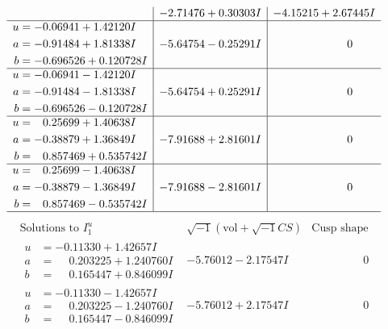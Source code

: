 \documentclass[1p]{elsarticle_modified}
\theoremstyle{definition}
\newcommand{\I}{\sqrt{-1}}
\begin{document}
$$\begin{array}{c|c|c}
 & -2.71476 + 0.30303 I & -4.15215 + 2.67445 I \\ \hline\begin{aligned}
u &= -0.06941 + 1.42120 I \\
a &= -0.91484 + 1.81338 I \\
b &= -0.696526 + 0.120728 I\end{aligned}
 & -5.64754 - 0.25291 I & \phantom{-0.000000 } 0 \\ \hline\begin{aligned}
u &= -0.06941 - 1.42120 I \\
a &= -0.91484 - 1.81338 I \\
b &= -0.696526 - 0.120728 I\end{aligned}
 & -5.64754 + 0.25291 I & \phantom{-0.000000 } 0 \\ \hline\begin{aligned}
u &= \phantom{-}0.25699 + 1.40638 I \\
a &= -0.38879 + 1.36849 I \\
b &= \phantom{-}0.857469 + 0.535742 I\end{aligned}
 & -7.91688 + 2.81601 I & \phantom{-0.000000 } 0 \\ \hline\begin{aligned}
u &= \phantom{-}0.25699 - 1.40638 I \\
a &= -0.38879 - 1.36849 I \\
b &= \phantom{-}0.857469 - 0.535742 I\end{aligned}
 & -7.91688 - 2.81601 I & \phantom{-0.000000 } 0\\
 \hline 
 \end{array}$$\newpage$$\begin{array}{c|c|c}  
\text{Solutions to }I^u_{1}& \I (\text{vol} + \sqrt{-1}CS) & \text{Cusp shape}\\
 \hline 
\begin{aligned}
u &= -0.11330 + 1.42657 I \\
a &= \phantom{-}0.203225 + 1.240760 I \\
b &= \phantom{-}0.165447 + 0.846099 I\end{aligned}
 & -5.76012 - 2.17547 I & \phantom{-0.000000 } 0 \\ \hline\begin{aligned}
u &= -0.11330 - 1.42657 I \\
a &= \phantom{-}0.203225 - 1.240760 I \\
b &= \phantom{-}0.165447 - 0.846099 I\end{aligned}
 & -5.76012 + 2.17547 I & \phantom{-0.000000 } 0 \\ \hline\begin{aligned}

\end{aligned}
\end{array}$$
\end{document}
